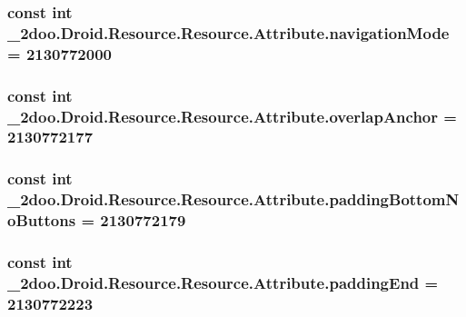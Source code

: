 \hypertarget{class__2doo_1_1_droid_1_1_resource_1_1_attribute_57ad2a56fc84939da3cd86d742e7646d}{
\subsubsection[{navigationMode}]{\setlength{\rightskip}{0pt plus 5cm}const int \_\-2doo.Droid.Resource.Resource.Attribute.navigationMode = 2130772000}}
\label{class__2doo_1_1_droid_1_1_resource_1_1_attribute_57ad2a56fc84939da3cd86d742e7646d}


\hypertarget{class__2doo_1_1_droid_1_1_resource_1_1_attribute_1cf897b87985d8d37d821de12b146e15}{
\subsubsection[{overlapAnchor}]{\setlength{\rightskip}{0pt plus 5cm}const int \_\-2doo.Droid.Resource.Resource.Attribute.overlapAnchor = 2130772177}}
\label{class__2doo_1_1_droid_1_1_resource_1_1_attribute_1cf897b87985d8d37d821de12b146e15}


\hypertarget{class__2doo_1_1_droid_1_1_resource_1_1_attribute_8fbb5fecae4da1d2bbd382091b4510b1}{
\subsubsection[{paddingBottomNoButtons}]{\setlength{\rightskip}{0pt plus 5cm}const int \_\-2doo.Droid.Resource.Resource.Attribute.paddingBottomNoButtons = 2130772179}}
\label{class__2doo_1_1_droid_1_1_resource_1_1_attribute_8fbb5fecae4da1d2bbd382091b4510b1}


\hypertarget{class__2doo_1_1_droid_1_1_resource_1_1_attribute_3e14e1dad106d73516726f0b5de7845f}{
\subsubsection[{paddingEnd}]{\setlength{\rightskip}{0pt plus 5cm}const int \_\-2doo.Droid.Resource.Resource.Attribute.paddingEnd = 2130772223}}
\label{class__2doo_1_1_droid_1_1_resource_1_1_attribute_3e14e1dad106d73516726f0b5de7845f}


